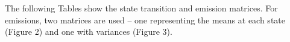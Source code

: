\documentclass[english]{article}
\numberwithin{equation}{section}
\DeclarePairedDelimiter\paren{(}{)}           %
\DeclarePairedDelimiter\bkt{[}{]}             %
\begin{document}
	The following Tables show the state transition and emission matrices. For emissions, two matrices are used -- one representing the means at each state (Figure 2) and one with variances (Figure 3).
%	
%	
%	
%	
%	
%	
%	
%	
	
	
	
\end{document}
